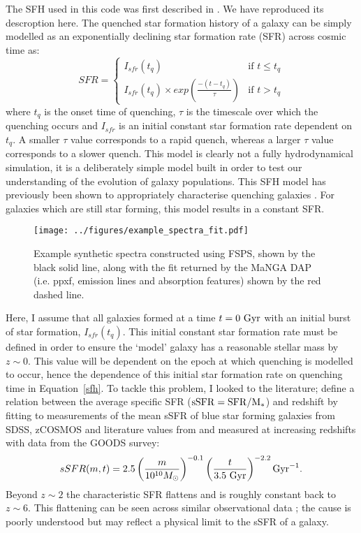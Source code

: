 \documentclass[useAMS,usenatbib]{mn2e}
\begin{document}
The SFH used in this code was first described in \cite{smethurst15}. We have reproduced its descroption here. The quenched star formation history of a galaxy can be simply modelled as an exponentially declining star formation rate (SFR) across cosmic time as:
\begin{equation}\label{sfh}
SFR =
\begin{cases}
I_{sfr}(t_q) & \text{if } t \leq t_q \\
I_{sfr}(t_q) \times exp{\left( \frac{-(t-t_{q})}{\tau}\right)} & \text{if } t > t_q 
\end{cases}
\end{equation}
where $t_{q}$ is the onset time of quenching, $\tau$ is the timescale over which the quenching occurs and $I_{sfr}$ is an initial constant star formation rate dependent on $t_q$.  A smaller $\tau$ value corresponds to a rapid quench, whereas a larger $\tau$ value corresponds to a slower quench. This model is clearly not a fully hydrodynamical simulation, it is a deliberately simple model built in order to test our understanding of the evolution of galaxy populations. This SFH model has previously been shown to appropriately characterise quenching galaxies \citep{weiner06, martin07, noeske07,schawinski14}. For galaxies which are still star forming, this model results in a constant SFR.

\begin{figure*}
\centering
\texttt{[image: ../figures/example\_spectra\_fit.pdf]}
\caption{Example synthetic spectra constructed using FSPS, shown by the black solid line, along with the fit returned by the MaNGA DAP (i.e. ppxf, emission lines and absorption features) shown by the red dashed line. }
\label{fig:spectrafit}
\end{figure*}

Here, I assume that all galaxies formed at a time $t=0~\rm{Gyr}$ with an initial burst of star formation, $I_{sfr}(t_q)$. This initial constant star formation rate must be defined in order to ensure the `model' galaxy  has a reasonable stellar mass by $z\sim0$. This value will be dependent on the epoch at which quenching is modelled to occur, hence the dependence of this initial star formation rate on quenching time in Equation~\ref{sfh}. To tackle this problem, I looked to the literature; \citet[][Equation 1]{peng10} define a relation between the average specific SFR ($\rm{sSFR}=SFR/M_*$) and redshift by fitting to measurements of the mean sSFR of blue star forming galaxies from SDSS, zCOSMOS and literature values from \cite{elbaz07} and \cite{daddi07} measured at increasing redshifts with data from the GOODS survey:
\begin{equation}\label{eq:peng}
sSFR(m,t) = 2.5 \left( \frac{m}{10^{10} M_{\odot}} \right)^{-0.1} \left(\frac{t}{3.5 ~\rm{Gyr}}\right)^{-2.2} \rm{Gyr}^{-1}.
\end{equation}
Beyond $z \sim 2$ the characteristic SFR flattens and is roughly constant back to $z\sim6$. This flattening can be seen across similar observational data \citep{peng10, gonzalez10, bethermin12}; the cause is poorly understood but may reflect a physical limit to the sSFR of a galaxy. 
\end{document}
